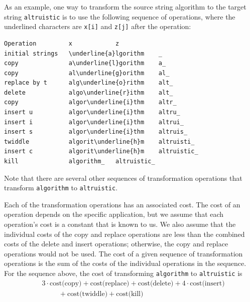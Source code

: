   As an example, one way to transform the source string algorithm to the target
  string \verb!altruistic! is to use the following sequence of operations, where the
  underlined characters are \verb!x[i]! and \verb!z[j]! after the operation:


  \begin{Verbatim}[frame=single,commandchars=\\\{\}]
Operation         x            z
initial strings   \underline{a}lgorithm    _
copy              a\underline{l}gorithm    a_
copy              al\underline{g}orithm    al_
replace by t      alg\underline{o}rithm    alt_
delete            algo\underline{r}ithm    alt_
copy              algor\underline{i}thm    altr_
insert u          algor\underline{i}thm    altru_
insert i          algor\underline{i}thm    altrui_
insert s          algor\underline{i}thm    altruis_
twiddle           algorit\underline{h}m    altruisti_
insert c          algorit\underline{h}m    altruistic_
kill              algorithm_   altruistic_
\end{Verbatim}

Note that there are several other sequences of
transformation operations that transform
\verb!algorithm! to \verb!altruistic!.

Each of the transformation operations has an associated cost.
The cost of an operation depends on the specific application,
but we assume that each operation's
cost is a constant that is known to us.
We also assume that the individual costs of
the copy and replace operations are less than the combined costs of the delete and
insert operations; otherwise, the copy and replace operations would not be used.
The cost of a given sequence of transformation operations is the sum of the costs
of the individual operations in the sequence. For the sequence above, the cost of
transforming \verb!algorithm! to \verb!altruistic! is
\begin{align*}
  &3 \cdot \text{cost(copy)} + \text{cost(replace)} + \text{cost(delete)} + 4\cdot \text{cost(insert)} \\
  &\hspace{1cm} + \text{cost(twiddle)} + \text{cost(kill)}
\end{align*}

